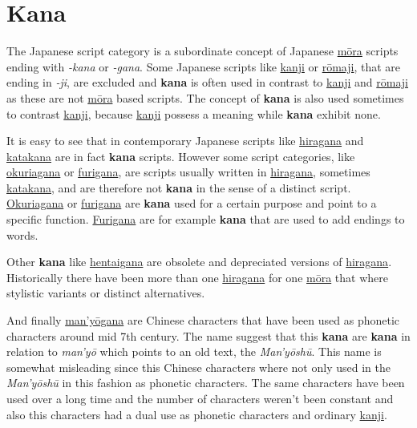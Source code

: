 \section{Kana}
\label{sec:Kana}


The Japanese script category \lkana{} is a subordinate concept of Japanese
\hyperref[sec:Mora]{mōra} scripts ending with \textit{-kana} or \textit{-gana}.
Some Japanese scripts like \hyperref[sec:Kanji]{kanji} or
\hyperref[sec:Romaji]{rōmaji}, that are ending in \textit{-ji}, are excluded
and \textbf{kana} is often used in contrast to \hyperref[sec:Kanji]{kanji} and
\hyperref[sec:Romaji]{rōmaji} as these are not \hyperref[sec:Mora]{mōra} based
scripts. The concept of \textbf{kana} is also used sometimes to contrast
\hyperref[sec:Kanji]{kanji}, because \hyperref[sec:Kanji]{kanji} possess a
meaning while \textbf{kana} exhibit none.

It is easy to see that in contemporary Japanese scripts like
\hyperref[sec:Hiragana]{hiragana} and \hyperref[sec:Katakana]{katakana} are in
fact \textbf{kana} scripts. However some script categories, like
\hyperref[sec:Okurigana]{okuriagana} or \hyperref[sec:Furigana]{furigana}, are
scripts usually written in \hyperref[sec:Hiragana]{hiragana}, sometimes
\hyperref[sec:Katakana]{katakana}, and are therefore not \textbf{kana} in the
sense of a distinct script. \hyperref[sec:Okurigana]{Okuriagana} or
\hyperref[sec:Furigana]{furigana} are \textbf{kana} used for a certain purpose
and point to a specific function. \hyperref[sec:Furigana]{Furigana} are for
example \textbf{kana} that are used to add endings to words.

Other \textbf{kana} like \hyperref[sec:Hentaigana]{hentaigana} are obsolete and
depreciated versions of \hyperref[sec:Hiragana]{hiragana}. Historically there
have been more than one \hyperref[sec:Hiragana]{hiragana} for one
\hyperref[sec:Mora]{mōra} that where stylistic variants or distinct
alternatives.

And finally \hyperref[sec:Manyogana]{man'yōgana} are Chinese characters that
have been used as phonetic characters around mid 7th century. The name suggest
that this \textbf{kana} are \textbf{kana} in relation to \textit{man'yō} which
points to an old text, the \textit{Man'yōshū}. This name is somewhat misleading
since this Chinese characters where not only used in the \textit{Man'yōshū} in
this fashion as phonetic characters. The same characters have been used over a
long time and the number of characters weren't been constant and also this
characters had a dual use as phonetic characters and ordinary
\hyperref[sec:Kanji]{kanji}.

